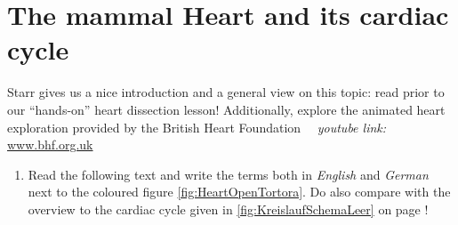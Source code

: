 

\areaset[0cm]{11.5cm}{27.4cm}
\section{The mammal Heart and its cardiac cycle}

			\begin{mdframed}[style=exampledefault, userdefinedwidth=12cm,frametitle={Starr 33.3}\label{mat:BEISPIELMATERIAL}]
			Starr gives us a nice introduction and a general view on this topic: read  prior to our ``hands-on'' heart dissection lesson!
			Additionally, explore the animated heart exploration provided by the British Heart Foundation \Forward ~~\textit{youtube link:} \href{http://www.bhf.org.uk/heart-health/how-your-heart-works/know-your-heart.aspx}{www.bhf.org.uk}
		\end{mdframed}

	\begin{enumerate}[resume,series=chapter]
	\item Read the following text and write the terms both in \emph{English} and \emph{German} next to the coloured figure \ref{fig:HeartOpenTortora}. Do also compare with the overview to the cardiac cycle given in \ref{fig:KreislaufSchemaLeer} on page \pageref{fig:KreislaufSchemaLeer}!
	\end{enumerate}



